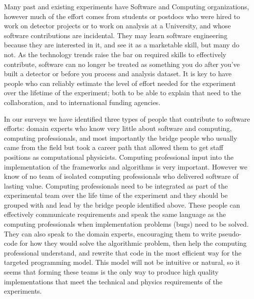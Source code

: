 Many past and existing experiments have Software and
Computing organizations, however much of the effort comes from
students or postdocs who were hired to work on detector
projects or to work on analysis at a University, and whose software
contributions are incidental. They may learn
software engineering because they are interested in it, and see it
as a marketable skill, but many do not.  As the technology trends
raise the bar on required skills to effectively contribute, software
can no longer be treated as something you do after you've built a
detector or before you process and analysis dataset. 
It is key to have people who can reliably estimate the level
of effort needed for the experiment over the lifetime of the
experiment; both to be able to explain that need to the collaboration,
and to international funding agencies.

In our surveys we have identified three types of people that
contribute to software efforts: domain experts who know very little
about software and computing, computing professionals, and most
importantly the bridge people who usually came from the field but
took a career path that allowed them to get staff positions as
computational physicists. Computing professional input into the
implementation of the frameworks and algorithms is very important.
However we know of no team of isolated computing professionals who
delivered software of lasting value.  Computing professionals need
to be integrated as part of the experimental team over the life
time of the experiment and they should be grouped with and lead by
the bridge people identified above. These people can effectively
communicate requirements and speak the same language as the computing
professionals when implementation problems (bugs) need to be solved.
They can also speak to the domain experts, encouraging them to write
pseudo-code for how they would solve the algorithmic problem, then
help the computing professional understand, and rewrite that code
in the most efficient way for the targeted programming model.  This
model will not be intuitive or natural, so it seems that forming
these teams is the only way to produce high quality implementations
that meet the technical and physics requirements of the
experiments.

